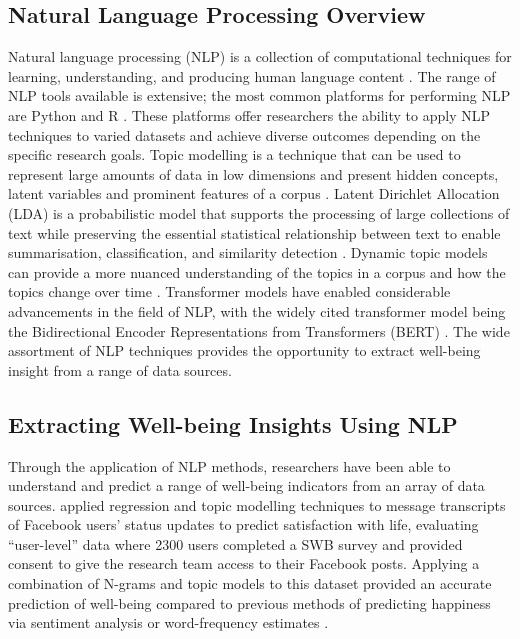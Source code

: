 \documentclass[12pt]{article}
\begin{document}
\subsection{Natural Language Processing Overview}
Natural language processing (NLP) is a collection of computational techniques for learning, understanding, and producing human language content \parencite{hirschberg_advances_2015}. The range of NLP tools available is extensive; the most common platforms for performing NLP are Python and R \parencite{shatte_machine_2018}. These platforms offer researchers the ability to apply NLP techniques to varied datasets and achieve diverse outcomes depending on the specific research goals.  
Topic modelling is a technique that can be used to represent large amounts of data in low dimensions and present hidden concepts, latent variables and prominent features of a corpus \parencite{kherwa_topic_2018}. Latent Dirichlet Allocation (LDA) is a probabilistic model that supports the processing of large collections of text while preserving the essential statistical relationship between text to enable summarisation, classification, and similarity detection \parencite{blei_latent_2003}. Dynamic topic models can provide a more nuanced understanding of the topics in a corpus and how the topics change over time \parencite{blei_dynamic_2006}. 
Transformer models have enabled considerable advancements in the field of NLP, with the widely cited transformer model being the Bidirectional Encoder Representations from Transformers (BERT) \parencite{devlin_bert_nodate}. The wide assortment of NLP techniques provides the opportunity to extract well-being insight from a range of data sources.\\
\subsection{Extracting Well-being Insights Using NLP}
Through the application of NLP methods, researchers have been able to understand and predict a range of well-being indicators from an array of data sources. 
\textcite{schwartz_predicting_2016} applied regression and topic modelling techniques to message transcripts of Facebook users’ status updates to predict satisfaction with life, evaluating “user-level” data where 2300 users completed a SWB survey and provided consent to give the research team access to their Facebook posts. Applying a combination of N-grams and topic models to this dataset provided an accurate prediction of well-being compared to previous methods of predicting happiness via sentiment analysis or word-frequency estimates \parencite{dodds_temporal_2011, mohammad_nrc-canada_2013}. 
\end{document}
